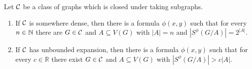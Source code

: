   \begin{theorem}\label{thm:vc-density-lower-bound}
  Let $\mathcal{C}$ be a class of graphs which 
  is closed under taking subgraphs. 
  \begin{enumerate}[(1)]
  \item If $\mathcal{C}$ is somewhere dense, then there is a formula 
  $\phi(x,y)$ such that for every $n\in \mathbb{N}$ there are $G\in\mathcal{C}$ and $A\subseteq V(G)$ 
  with $|A|=n$ and $|S^\phi(G/A)|=2^{|A|}$. 
  \item If $\mathcal{C}$ has unbounded expansion, then there is a formula 
  $\phi(x,y)$ such that for every $c\in \mathbb{R}$ there exist $G\in\mathcal{C}$ and $A\subseteq V(G)$ with $|S^\phi(G/A)|>c|A|$. 
  \end{enumerate}
  \end{theorem}



  
 


%



